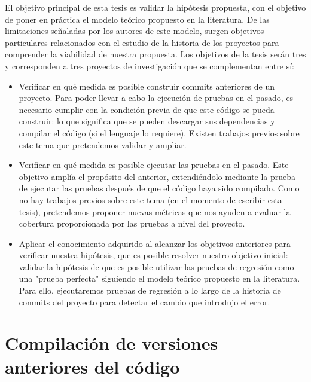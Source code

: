 El objetivo principal de esta tesis es validar la hipótesis propuesta, con el objetivo de poner en práctica el modelo teórico propuesto en la literatura. 
De las limitaciones señaladas por los autores de este modelo, surgen objetivos particulares relacionados con el estudio de la historia de los proyectos para comprender la viabilidad de nuestra propuesta. 
Los objetivos de la tesis serán tres y corresponden a tres proyectos de investigación que se complementan entre sí:
\begin{itemize}
    \item Verificar en qué medida es posible construir commits anteriores de un proyecto. Para poder llevar a cabo la ejecución de pruebas en el pasado, es necesario cumplir con la condición previa de que este código se pueda construir: lo que significa que se pueden descargar sus dependencias y compilar el código (si el lenguaje lo requiere). Existen trabajos previos sobre este tema que pretendemos validar y ampliar.
    \item Verificar en qué medida es posible ejecutar las pruebas en el pasado. Este objetivo amplía el propósito del anterior, extendiéndolo mediante la prueba de ejecutar las pruebas después de que el código haya sido compilado. Como no hay trabajos previos sobre este tema (en el momento de escribir esta tesis), pretendemos proponer nuevas métricas que nos ayuden a evaluar la cobertura proporcionada por las pruebas a nivel del proyecto.
    \item Aplicar el conocimiento adquirido al alcanzar los objetivos anteriores para verificar nuestra hipótesis, que es posible resolver nuestro objetivo inicial: validar la hipótesis de que es posible utilizar las pruebas de regresión como una "prueba perfecta" siguiendo el modelo teórico propuesto en la literatura. Para ello, ejecutaremos pruebas de regresión a lo largo de la historia de commits del proyecto para detectar el cambio que introdujo el error.
\end{itemize}

\section{Compilación de versiones anteriores del código}
\label{sec:resumen:buildability}

